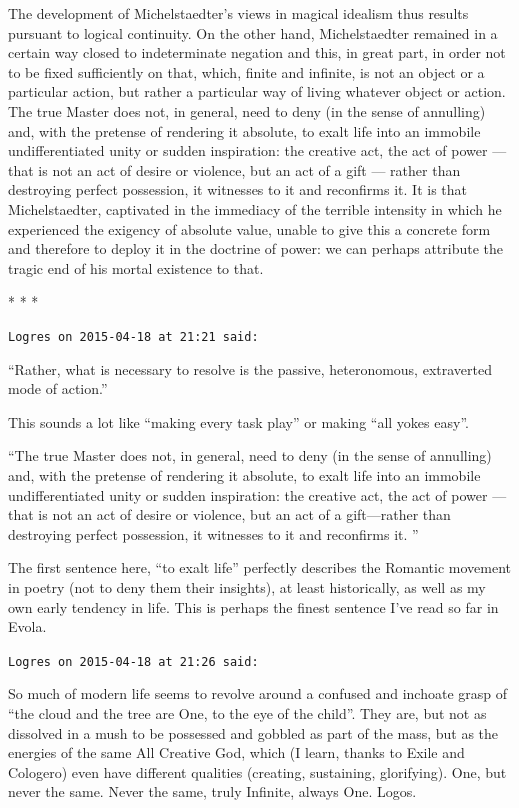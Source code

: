 The development of Michelstaedter's views in magical idealism thus results pursuant to logical continuity. On the other hand, Michelstaedter remained in a certain way closed to indeterminate negation and this, in great part, in order not to be fixed sufficiently on that, which, finite and infinite, is not an object or a particular action, but rather a particular way of living whatever object or action. The true Master does not, in general, need to deny (in the sense of annulling) and, with the pretense of rendering it absolute, to exalt life into an immobile undifferentiated unity or sudden inspiration: the creative act, the act of power --- that is not an act of desire or violence, but an act of a gift --- rather than destroying perfect possession, it witnesses to it and reconfirms it. It is that Michelstaedter, captivated in the immediacy of the terrible intensity in which he experienced the exigency of absolute value, unable to give this a concrete form and therefore to deploy it in the doctrine of power: we can perhaps attribute the tragic end of his mortal existence to that.



\begin{center}* * *\end{center}

\begin{footnotesize}
\begin{sffamily}
\texttt{Logres on 2015-04-18 at 21:21 said:}

``Rather, what is necessary to resolve is the passive, heteronomous, extraverted mode of action.''

This sounds a lot like ``making every task play'' or making ``all yokes easy''.

``The true Master does not, in general, need to deny (in the sense of annulling) and, with the pretense of rendering it absolute, to exalt life into an immobile undifferentiated unity or sudden inspiration: the creative act, the act of power ---that is not an act of desire or violence, but an act of a gift---rather than destroying perfect possession, it witnesses to it and reconfirms it. ''

The first sentence here, ``to exalt life'' perfectly describes the Romantic movement in poetry (not to deny them their insights), at least historically, as well as my own early tendency in life. This is perhaps the finest sentence I've read so far in Evola.

\hfill

\texttt{Logres on 2015-04-18 at 21:26 said:}

So much of modern life seems to revolve around a confused and inchoate grasp of ``the cloud and the tree are One, to the eye of the child''. They are, but not as dissolved in a mush to be possessed and gobbled as part of the mass, but as the energies of the same All Creative God, which (I learn, thanks to Exile and Cologero) even have different qualities (creating, sustaining, glorifying). One, but never the same. Never the same, truly Infinite, always One. Logos.

\end{sffamily}
\end{footnotesize}